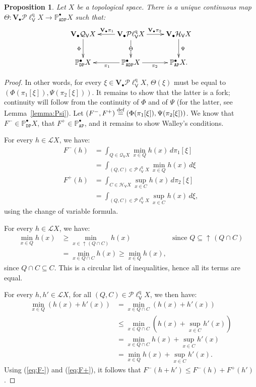 \documentclass[preprint,12pt]{elsarticle}
\newcommand\eqdef{\mathrel{\buildrel \text{def}\over=}}
\DeclareMathOperator{\upc}{\uparrow\!}
\newcommand\Lform{\mathcal L}
\newcommand\Pred{\mathbb{P}}
\newcommand\Angel{{\mathtt{A}}}
\newcommand\Demon{{\mathtt{D}}}
\newcommand\Nature{{\mathtt{P}}}
\newcommand\AN{{\Angel\Nature}}
\newcommand\DN{{\Demon\Nature}}
\newcommand\ADN{{\Angel\Demon\Nature}}
\newcommand\Smyth{{\mathcal Q}}
\newcommand\Hoare{{\mathcal H}}
\newcommand\Vt{\mathsf{V}}
\newcommand\HV{\Hoare_\Vt}
\newcommand\SV{\Smyth_{\Vt}}
\newcommand\quasi{\mathrm{q}} %
\newcommand\QL{\Plotkin^\quasi}
\newcommand\QLV{\QL_\Vt}
\newcommand\Plotkin{\mathcal P\ell} %
\newcommand\Val{{\mathbf V}}
\newtheorem{proposition}[theorem]{Proposition}
\begin{document}
\begin{proposition}
  \label{prop:PsiPhi}
  Let $X$ be a topological space.  There is a unique continuous map
  $\Theta \colon \Val_\bullet {\QLV X} \to \Pred_\ADN^\bullet X$ such
  that:
  \[
    \xymatrix{
      \Val_\bullet {\SV X}
      \ar[d]_{\Phi}
      & \Val_\bullet {\QLV X}
      \ar[l]_{\Val_\bullet {\pi_1}}
      \ar[d]|{\Theta}
      \ar[r]^{\Val_\bullet {\pi_2}}
      & \Val_\bullet {\HV X}
      \ar[d]^{\Psi}
      \\
      \Pred_\DN^\bullet X
      & \Pred_\ADN^\bullet X
      \ar[l]^{\pi_1}
      \ar[r]_{\pi_2}
      & \Pred_\AN^\bullet X.
      }
  \]
\end{proposition}
\begin{proof}
  In other words, for every $\xi \in \Val_\bullet {\QLV X}$,
  $\Theta (\xi)$ must be equal to
  $(\Phi (\pi_1 [\xi]), \Psi (\pi_2 [\xi]))$.  It remains to show that
  the latter is a fork; continuity will follow from the continuity of
  $\Phi$ and of $\Psi$ (for the latter, see Lemma~\ref{lemma:Psi}).
  Let $(F^-, F^+) \eqdef (\Phi (\pi_1 [\xi]), \Psi (\pi_2 [\xi]))$.
  We know that $F^- \in \Pred_\DN^\bullet X$, that
  $F^+ \in \Pred_\AN^\bullet$, and it remains to show Walley's
  conditions.

  For every $h \in \Lform X$, we have:
  \begin{align}
    \nonumber
    F^- (h)
    & = \int_{Q \in \SV X} \min_{x \in Q} h (x)
      \,d\pi_1 [\xi] \\
    \label{eq:F-}
    & = \int_{(Q, C) \in \QLV X} \min_{x \in Q} h (x)
      \,d\xi \\
    \nonumber
    F^+ (h)
    & = \int_{C \in \HV X} \sup_{x \in C} h (x)
      \,d\pi_2 [\xi] \\
    \label{eq:F+}
    & = \int_{(Q, C) \in \QLV X} \sup_{x \in C} h (x)
      \,d\xi,
  \end{align}
  using the change of variable formula.
  
  For every $h \in \Lform X$, we have:
  \begin{align*}
    \min_{x \in Q} h (x)
    & \geq \min_{x \in \upc (Q \cap C)} h (x)
    & \text{since $Q \subseteq \upc (Q \cap C)$} \\
    & = \min_{x \in Q \cap C} h (x)
      \geq \min_{x \in Q} h (x),
  \end{align*}
  since $Q \cap C \subseteq C$.  This is a circular list of
  inequalities, hence all its terms are equal. 
  
  For every $h, h' \in \Lform X$, for all $(Q, C) \in \QLV X$, we then
  have:
  \begin{align}
    \nonumber
    \min_{x \in Q} (h (x) + h' (x))
    & = \min_{x \in Q \cap C} (h (x) + h' (x)) \\
    \nonumber
    & \leq \min_{x \in Q \cap C} (h (x) + \sup_{x \in C} h' (x)) \\
    \nonumber
    & = \min_{x \in Q \cap C} h (x) + \sup_{x \in C} h' (x) \\
    \label{eq:min:QLV}
    & = \min_{x \in Q} h (x) + \sup_{x \in C} h' (x).
  \end{align}
  Using (\ref{eq:F-}) and (\ref{eq:F+}), it follows that $F^- (h+h')
  \leq F^- (h) + F^+ (h')$.


\end{proof}
\end{document}
